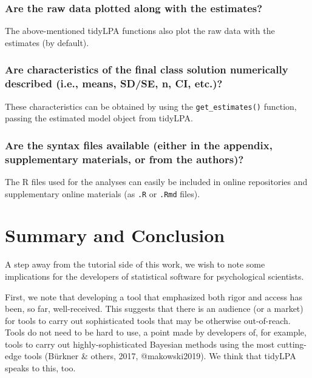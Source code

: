 \documentclass[english,man]{apa6}
\begin{document}
\hypertarget{are-the-raw-data-plotted-along-with-the-estimates}{%
\subsubsection{Are the raw data plotted along with the estimates?}\label{are-the-raw-data-plotted-along-with-the-estimates}}

The above-mentioned tidyLPA functions also plot the raw data with the estimates (by default).

\hypertarget{are-characteristics-of-the-final-class-solution-numerically-described-i.e.-means-sdse-n-ci-etc.}{%
\subsubsection{Are characteristics of the final class solution numerically described (i.e., means, SD/SE, n, CI, etc.)?}\label{are-characteristics-of-the-final-class-solution-numerically-described-i.e.-means-sdse-n-ci-etc.}}

These characteristics can be obtained by using the \texttt{get\_estimates()} function, passing the estimated model object from tidyLPA.

\hypertarget{are-the-syntax-files-available-either-in-the-appendix-supplementary-materials-or-from-the-authors}{%
\subsubsection{Are the syntax files available (either in the appendix, supplementary materials, or from the authors)?}\label{are-the-syntax-files-available-either-in-the-appendix-supplementary-materials-or-from-the-authors}}

The R files used for the analyses can easily be included in online repositories and supplementary online materials (as \texttt{.R} or \texttt{.Rmd} files).

\hypertarget{summary-and-conclusion}{%
\section{Summary and Conclusion}\label{summary-and-conclusion}}

A step away from the tutorial side of this work, we wish to note some
implications for the developers of statistical software for psychological
scientists.

First, we note that developing a tool that emphasized both rigor and access has
been, so far, well-received. This suggests that there is an audience (or a
market) for tools to carry out sophisticated tools that may be otherwise
out-of-reach. Tools do not need to be hard to use, a point made by developers
of, for example, tools to carry out highly-sophisticated Bayesian methods using
the most cutting-edge tools (Bürkner \& others, 2017, @makowski2019). We think that
tidyLPA speaks to this, too.
\end{document}
